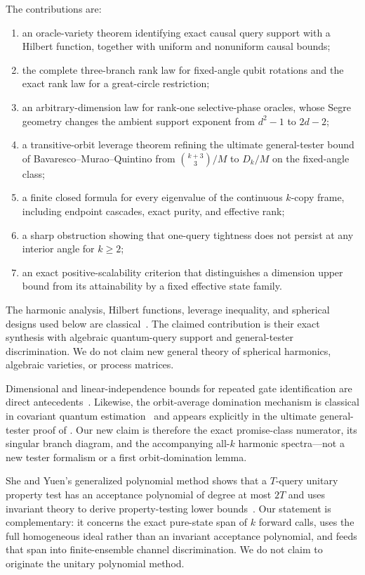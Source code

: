 \documentclass[11pt]{article}
\theoremstyle{definition}
\theoremstyle{remark}
\begin{document}
The contributions are:
\begin{enumerate}
\item an oracle-variety theorem identifying exact causal query support with a
Hilbert function, together with uniform and nonuniform causal bounds;
\item the complete three-branch rank law for fixed-angle qubit rotations and
the exact rank law for a great-circle restriction;
\item an arbitrary-dimension law for rank-one selective-phase oracles, whose
Segre geometry changes the ambient support exponent from $d^2-1$ to $2d-2$;
\item a transitive-orbit leverage theorem refining the ultimate general-tester
bound of Bavaresco--Murao--Quintino from $\binom{k+3}{3}/M$ to
$D_k/M$ on the fixed-angle class;
\item a finite closed formula for every eigenvalue of the continuous
$k$-copy frame, including endpoint cascades, exact purity, and effective rank;
\item a sharp obstruction showing that one-query tightness does not persist
at any interior angle for $k\geq2$;
\item an exact positive-scalability criterion that distinguishes a dimension
upper bound from its attainability by a fixed effective state family.
\end{enumerate}

The harmonic analysis, Hilbert functions, leverage inequality, and spherical
designs used below are classical~\cite{seeley1966,delsarte1977}.  The claimed
contribution is their exact synthesis with algebraic quantum-query support
and general-tester discrimination.  We do not claim new general theory of
spherical harmonics, algebraic varieties, or process matrices.

Dimensional and linear-independence bounds for repeated gate identification
are direct antecedents~\cite{chefles2007,chiribella2013}.  Likewise, the
orbit-average domination mechanism is classical in covariant quantum
estimation~\cite{chiribella2006} and appears explicitly in the ultimate
general-tester proof of \cite[Appendix F]{bavaresco2022}.  Our new claim is
therefore the exact promise-class numerator, its singular branch diagram, and
the accompanying all-$k$ harmonic spectra---not a new tester formalism or a
first orbit-domination lemma.

She and Yuen's generalized polynomial method shows that a $T$-query unitary
property test has an acceptance polynomial of degree at most $2T$ and uses
invariant theory to derive property-testing lower bounds~\cite{sheyuen2023}.
Our statement is complementary: it concerns the exact pure-state span of
$k$ forward calls, uses the full homogeneous ideal rather than an invariant
acceptance polynomial, and feeds that span into finite-ensemble channel
discrimination.  We do not claim to originate the unitary polynomial method.
\end{document}
